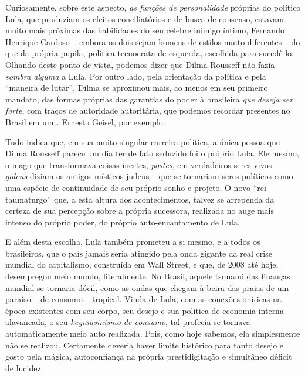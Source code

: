 Curiosamente, sobre este aspecto, \emph{as funções de personalidade}
próprias do político Lula, que produziam os efeitos conciliatórios e de
busca de consenso, estavam muito mais próximas das habilidades do seu
célebre inimigo íntimo, Fernando Henrique Cardoso -- embora os dois
sejam homens de estilos muito diferentes -- do que da própria pupila,
política tecnocrata de esquerda, escolhida para sucedê-lo. Olhando deste
ponto de vista, podemos dizer que Dilma Rousseff não fazia \emph{sombra
alguma} a Lula. Por outro lado, pela orientação da política e pela
``maneira de lutar'', Dilma se aproximou mais, ao menos em seu primeiro
mandato, das formas próprias das garantias do poder à brasileira
\emph{que deseja ser forte}, com traços de autoridade autoritária, que
podemos recordar presentes no Brasil em um… Ernesto Geisel, por
exemplo.

Tudo indica que, em sua muito singular carreira política, a única pessoa
que Dilma Rousseff parece um dia ter de fato seduzido foi o próprio
Lula. Ele mesmo, o mago que transformava coisas inertes, \emph{postes},
em verdadeiros seres vivos -- \emph{golens} diziam os antigos místicos
judeus -- que se tornariam seres políticos como uma espécie de
continuidade de seu próprio sonho e projeto. O novo ``rei taumaturgo''
que, a esta altura dos acontecimentos, talvez se arrependa da certeza de
sua percepção sobre a própria sucessora, realizada no auge mais intenso
do próprio poder, do próprio auto-encantamento de Lula.

E além desta escolha, Lula também prometeu a si mesmo, e a todos os
brasileiros, que o país jamais seria atingido pela onda gigante da real
crise mundial do capitalismo, construída em Wall Street, e que, de 2008
até hoje, desempregou meio mundo, literalmente. No Brasil, aquele
tsunami das finanças mundial se tornaria dócil, como as ondas que chegam
à beira das praias de um paraíso -- de consumo -- tropical. Vinda de
Lula, com as conexões oníricas na época existentes com seu corpo, seu
desejo e sua política de economia interna alavancada, o seu
\emph{keyniasinismo de consumo}, tal profecia se tornava automaticamente
meio auto realizada. Pois, como hoje sabemos, ela simplesmente não se
realizou. Certamente deveria haver limite histórico para tanto desejo e
gosto pela mágica, autoconfiança na própria prestidigitação e simultâneo
déficit de lucidez.


